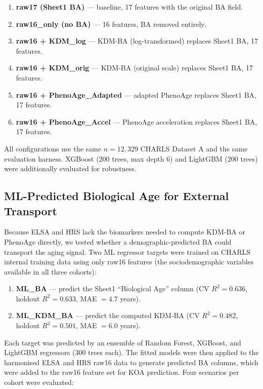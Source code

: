 \documentclass[11pt,a4paper]{article}
\begin{document}
\begin{enumerate}
  \item \textbf{raw17 (Sheet1 BA)} --- baseline, 17 features with the original BA field.
  \item \textbf{raw16\_only (no BA)} --- 16 features, BA removed entirely.
  \item \textbf{raw16 + KDM\_log} --- KDM-BA (log-transformed) replaces Sheet1 BA, 17 features.
  \item \textbf{raw16 + KDM\_orig} --- KDM-BA (original scale) replaces Sheet1 BA, 17 features.
  \item \textbf{raw16 + PhenoAge\_Adapted} --- adapted PhenoAge replaces Sheet1 BA, 17 features.
  \item \textbf{raw16 + PhenoAge\_Accel} --- PhenoAge acceleration replaces Sheet1 BA, 17 features.
\end{enumerate}

All configurations use the same $n=12{,}329$ CHARLS Dataset A and the same evaluation harness.
XGBoost (200 trees, max depth 6) and LightGBM (200 trees) were additionally evaluated for
robustness.

\subsection{ML-Predicted Biological Age for External Transport}
\label{sec:ml-ba}

Because ELSA and HRS lack the biomarkers needed to compute KDM-BA or PhenoAge directly, we tested
whether a demographic-predicted BA could transport the aging signal. Two ML regressor targets were
trained on CHARLS internal training data using only raw16 features (the sociodemographic variables
available in all three cohorts):

\begin{enumerate}
  \item \textbf{ML\_BA} --- predict the Sheet1 ``Biological Age'' column (CV $R^2=0.636$,
        holdout $R^2=0.633$, MAE $=4.7$ years).
  \item \textbf{ML\_KDM\_BA} --- predict the computed KDM-BA (CV $R^2=0.482$,
        holdout $R^2=0.501$, MAE $=6.0$ years).
\end{enumerate}

Each target was predicted by an ensemble of Random Forest, XGBoost, and LightGBM regressors
(300 trees each). The fitted models were then applied to the harmonised ELSA and HRS raw16
data to generate predicted BA columns, which were added to the raw16 feature set for KOA
prediction. Four scenarios per cohort were evaluated:
\end{document}

